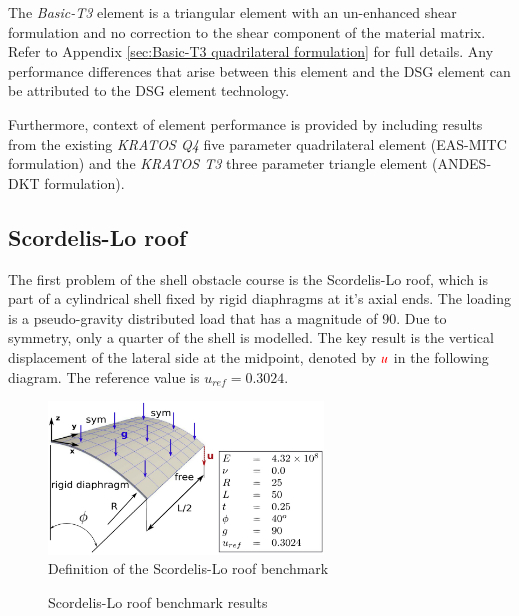 The \textit{Basic-T3} element is a triangular element with an un-enhanced shear formulation and no correction to the shear component of the material matrix. Refer to Appendix \ref{sec:Basic-T3 quadrilateral formulation} for full details. Any performance differences that arise between this element and the DSG element can be attributed to the DSG element technology.

Furthermore, context of element performance is provided by including results from the existing \textit{KRATOS Q4} five parameter quadrilateral element (EAS-MITC formulation) and the \textit{KRATOS T3} three parameter triangle element (ANDES-DKT formulation).
\newpage
\subsection{Scordelis-Lo roof}
%

The first problem of the shell obstacle course is the Scordelis-Lo roof, which is part of a cylindrical shell fixed by rigid diaphragms at it's axial ends. The loading is a pseudo-gravity distributed load that has a magnitude of 90. Due to symmetry, only a quarter of the shell is modelled. The key result is the vertical displacement of the lateral side at the midpoint, denoted by $\textcolor{red}{u}$ in the following diagram. The reference value is $u_{ref} = 0.3024$.
 
  \begin{figure}[H]
 	\centering
 	\def\svgwidth{\columnwidth}
 	\includegraphics[width=7.3cm]{images/scordelisroof.png}
 	\caption{Definition of the Scordelis-Lo roof benchmark\cite{Bou13}}
 \end{figure}
 
\begin{figure}[H]
	\caption{\label{ref_label_overall}Scordelis-Lo roof benchmark results}
\end{figure}

